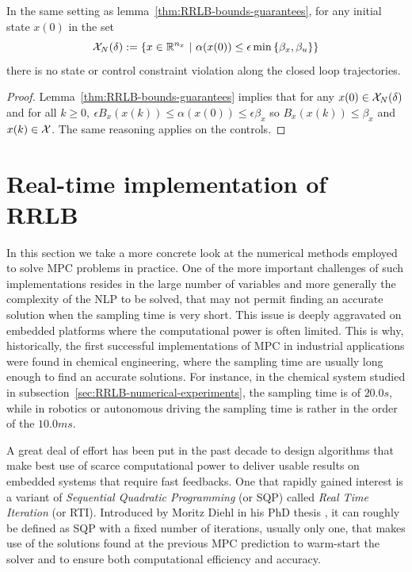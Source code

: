 \documentclass[12pt]{article}
\begin{document}
\begin{theorem}
	In the same setting as lemma~\ref{thm:RRLB-bounds-guarantees}, for any initial state $x(0)$ in the set
	$$\cal{X}_N(\delta):=\left\{x\in\R^{n_x}~|~\alpha(x(0))\leq\epsilon\min\left\{\beta_x,\beta_u\right\}\right\}$$
	there is no state or control constraint violation along the closed loop trajectories.
\end{theorem}

\begin{proof}
	Lemma~\ref{thm:RRLB-bounds-guarantees} implies that for any $x(0)\in\cal{X}_N(\delta)$ and for all $k\geq 0,~\epsilon B_x(x(k))\leq\alpha(x(0))\leq\epsilon\beta_x$ so $B_x(x(k))\leq \beta_x$ and $x(k)\in\cal{X}$.
	The same reasoning applies on the controls.
\end{proof}


\section{Real-time implementation of RRLB}\label{sec:RRLB-numerical-aspects}

In this section we take a more concrete look at the numerical methods employed to solve MPC problems in practice.
One of the more important challenges of such implementations resides in the large number of variables and more generally the complexity of the NLP to be solved, that may not permit finding an accurate solution when the sampling time is very short.
This issue is deeply aggravated on embedded platforms where the computational power is often limited.
This is why, historically, the first successful implementations of MPC in industrial applications were found in chemical engineering, where the sampling time are usually long enough to find an accurate solutions.
For instance, in the chemical system studied in subsection~\ref{sec:RRLB-numerical-experiments}, the sampling time is of $20.0s$, while in robotics or autonomous driving the sampling time is rather in the order of the $10.0ms$.

A great deal of effort has been put in the past decade to design algorithms that make best use of scarce computational power to deliver usable results on embedded systems that require fast feedbacks.
One that rapidly gained interest is a variant of \textit{Sequential Quadratic Programming} (or SQP) called \textit{Real Time Iteration} (or RTI).
Introduced by Moritz Diehl in his PhD thesis \cite{rti-diehl}, it can roughly be defined as SQP with a fixed number of iterations, usually only one, that makes use of the solutions found at the previous MPC prediction to warm-start the solver and to ensure both computational efficiency and accuracy.
\end{document}
